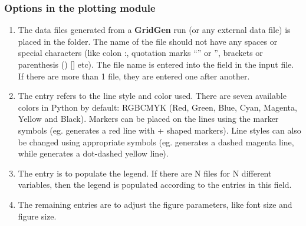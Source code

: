 \documentclass[letterpaper,10pt,english]{sphinxmanual}
\begin{document}
\subsubsection{Options in the plotting module}
\label{\detokenize{gridpyfiles/plot:options-in-the-plotting-module}}\begin{enumerate}
\item {} 
The data files generated from a {\color{red}\bfseries{}\textbar{}GridGen\textbar{}} run (or any external data file) is placed in the  folder. The name of the file should not have any spaces or special characters (like colon :, quotation marks “” or ”, brackets or parenthesis () {[}{]} etc). The file name is entered into the  field in the input file. If there are more than 1 file, they are entered one after another.

\item {} 
The  entry refers to the line style and color used. There are seven available colors in Python by default: RGBCMYK (Red, Green, Blue, Cyan, Magenta, Yellow and Black). Markers can be placed on the lines using the marker symbols (eg.  generates a red line with + shaped markers). Line styles can also be changed using appropriate symbols (eg.  generates a dashed magenta line, while  generates a dot-dashed yellow line).

\item {} 
The  entry is to populate the legend. If there are N files for N different variables, then the legend is populated according to the entries in this field.

\item {} 
The remaining entries are to adjust the figure parameters, like font size and figure size.

\end{enumerate}
\end{document}
